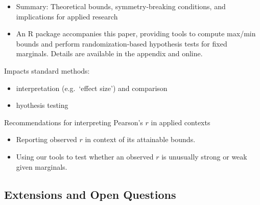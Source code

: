 \documentclass[
  12pt,
]{article}
\providecommand{\tightlist}{%
  \setlength{\itemsep}{0pt}\setlength{\parskip}{0pt}}\usepackage{longtable,booktabs,array}
\theoremstyle{plain}
\theoremstyle{definition}
\theoremstyle{remark}
\begin{document}
\begin{itemize}
\tightlist
\item
  Summary: Theoretical bounds, symmetry-breaking conditions, and
  implications for applied research
\item
  An R package accompanies this paper, providing tools to compute
  max/min bounds and perform randomization-based hypothesis tests for
  fixed marginals. Details are available in the appendix and online.
\end{itemize}

Impacts standard methods:

\begin{itemize}
\tightlist
\item
  interpretation (e.g.~`effect size') and comparison
\item
  hyothesis testing
\end{itemize}

Recommendations for interpreting Pearson's \(r\) in applied contexts

\begin{itemize}
\tightlist
\item
  Reporting observed \(r\) in context of its attainable bounds.
\item
  Using our tools to test whether an observed \(r\) is unusually strong
  or weak given marginals.
\end{itemize}

\subsection{Extensions and Open
Questions}\label{extensions-and-open-questions}
\end{document}
